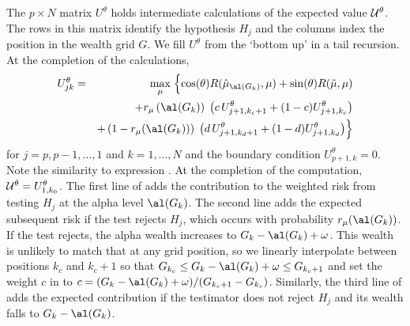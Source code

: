 \documentclass[12pt]{article}
\begin{document}
 The $p \times N$ matrix $U^{\theta}$ holds intermediate calculations of the
 expected value ${\cal U}^{\theta}$.  The rows in this matrix identify the hypothesis $H_j$
 and the columns index the position in the wealth grid $G$.  We fill $U^\theta$
 from the `bottom up' in a tail recursion.  At the completion of the
 calculations,
 \begin{eqnarray}
   U^\theta_{jk} &=&  \max_\mu \;\Bigl\{
     \cos(\theta) R(\hat\mu_{\al(G_k)}, \mu) + \sin(\theta) R(\tilde{\mu},\mu) \cr
     & &+ r_\mu\left(\al(G_k)\right) \;
          \left(c \,U^{\theta}_{j+1,k_c+1} + (1-c) U^{\theta}_{j+1,k_c}\right) \cr
     & & + \left(1- r_\mu(\al(G_k))\right) \; 
          \left(d \,U^{\theta}_{j+1,k_d+1} + (1-d) U^{\theta}_{j+1,k_d}\right)   
     \Bigr\}
 \label{eq:Ujk}
 \end{eqnarray}
 for $j=p, p-1,\ldots,1$ and $k = 1,\ldots,N$ and the boundary condition
 $U^\theta_{p+1,k} = 0$.  Note the similarity to expression .  At
 the completion of the computation, ${\cal U}^\theta = U^{\theta}_{1,k_0}$.  The
 first line of  adds the contribution to the weighted risk from
 testing $H_j$ at the alpha level $\al(G_k)$.  The second line adds the expected
 subsequent risk if the test rejects $H_j$, which occurs with probability
 $r_\mu(\al(G_k))$.  If the test rejects, the alpha wealth increases to $G_k -
 \al(G_k) + \omega$.  This wealth is unlikely to match that at any grid
 position, so we linearly interpolate between positions $k_c$ and $k_c+1$ so
 that $G_{k_c} \le G_k - \al(G_k) + \omega \le G_{k_c+1}$ and set the weight $c$
 in  to $c = (G_k - \al(G_k) + \omega)/(G_{k_c+1}-G_{k_c})$.
  Similarly, the third line of  adds the expected contribution if
 the testimator does not reject $H_j$ and its wealth falls to $G_k - \al(G_k)$.

\end{document}
